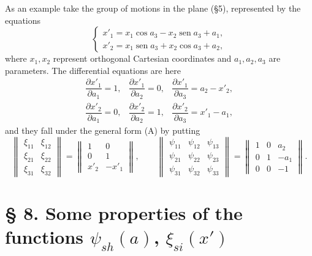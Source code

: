 \documentclass[11pt]{book}
\newcommand{\sen}{\operatorname{sen}}
\begin{document}
As an example take the group of motions in the plane (\S{}5), represented by the equations
\[
\begin{cases}
 x'_1=x_1\cos a_3-x_2\sen a_3+a_1,\\
 x'_2=x_1\sen a_3+x_2\cos a_3+a_2,
\end{cases}
\]
where $x_1,x_2$ represent orthogonal Cartesian coordinates and $a_1,a_2,a_3$ are parameters. The differential equations are here
\[
\begin{array}{lll}
 \dfrac{\partial x'_1}{\partial a_1}=1, &
 \dfrac{\partial x'_1}{\partial a_2}=0, &
 \dfrac{\partial x'_1}{\partial a_3}=a_2-x'_2,\\[0.9em]
 \dfrac{\partial x'_2}{\partial a_1}=0, &
 \dfrac{\partial x'_2}{\partial a_2}=1, &
 \dfrac{\partial x'_2}{\partial a_3}=x'_1-a_1,
\end{array}
\]
and they fall under the general form (A) by putting
\[
 \left\|\begin{array}{cc}
 \xi_{11}&\xi_{12}\\
 \xi_{21}&\xi_{22}\\
 \xi_{31}&\xi_{32}
 \end{array}\right\|
 =
 \left\|\begin{array}{cc}
 1&0\\
 0&1\\
 x'_2&-x'_1
 \end{array}\right\|,
 \qquad
 \left\|\begin{array}{ccc}
 \psi_{11}&\psi_{12}&\psi_{13}\\
 \psi_{21}&\psi_{22}&\psi_{23}\\
 \psi_{31}&\psi_{32}&\psi_{33}
 \end{array}\right\|
 =
 \left\|\begin{array}{ccc}
 1&0&a_2\\
 0&1&-a_1\\
 0&0&-1
 \end{array}\right\|.
\]


\section*{\S{} 8. Some properties of the functions $\psi_{sh}(a)$, $\xi_{si}(x')$}
\end{document}
